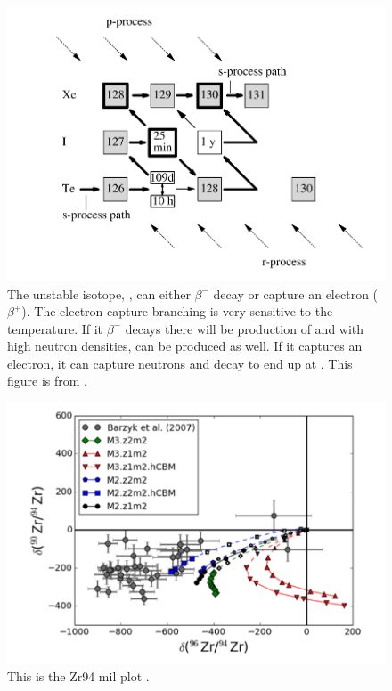 \documentclass[fleqn,usenatbib]{mnras}
\begin{document}
\begin{figure}
	\includegraphics[width=\columnwidth]{figs/xe.png}
    \caption{The unstable isotope, \iodine[128], can either $\beta^{-}$ decay or capture an electron ($\beta^{+}$). The electron capture branching is very sensitive to the temperature. If it $\beta^{-}$ decays there will be production of \xenon[128] and with high neutron densities, \xenon[130] can be produced as well. If it captures an electron, it can capture neutrons and decay to end up at \xenon[130]. This figure is from \citep{reif}.}
\end{figure}

\begin{figure}
  \includegraphics[width=\columnwidth]{figs/Zr94.png}
  \caption{This is the Zr94 mil plot \citet{zr}.} 
\end{figure}
\end{document}
